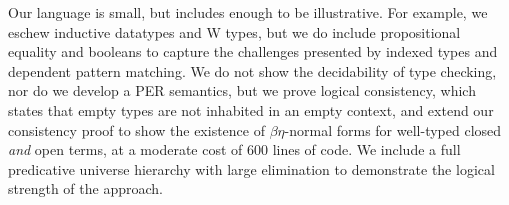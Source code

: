 \documentclass[\ifpublic nolinenum\else\fi,online,OA]{jfp}
\newcommand{\lang}{$\lambda^{\Pi}$\xspace}
\theoremstyle{definition}
\begin{document}
Our language is small, but includes enough to be illustrative. For example, we
eschew inductive datatypes and W types, but we do include propositional
equality and booleans to capture the challenges presented by indexed types and
dependent pattern matching. We do not show the decidability of type checking,
nor do we develop a PER semantics, but we prove logical consistency, which
states that empty types are not inhabited in an empty context,
and extend our consistency proof to show the existence of $\beta\eta$-normal
forms for well-typed closed \emph{and} open terms,
at a moderate cost of 600 lines of code.
We include a full predicative universe hierarchy with large elimination
to demonstrate the logical strength of the approach.

\end{document}
